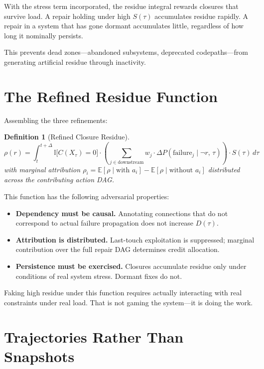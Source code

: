 \documentclass[12pt]{article}
\newtheorem{definition}{Definition}
\begin{document}
With the stress term incorporated, the residue integral rewards closures
that survive load. A repair holding under high $S(\tau)$ accumulates
residue rapidly. A repair in a system that has gone dormant accumulates
little, regardless of how long it nominally persists.

This prevents dead zones---abandoned subsystems, deprecated
codepaths---from generating artificial residue through inactivity.

\section{The Refined Residue Function}

Assembling the three refinements:

\begin{definition}[Refined Closure Residue]
\[
  \rho(r) = \int_{t}^{t+\Delta}
    \mathbb{I}\bigl[C(X_\tau) = 0\bigr]
    \cdot
    \left(
      \sum_{j \in \mathrm{downstream}}
        w_j \cdot \Delta P\!\left(\mathrm{failure}_j \mid \neg r,\, \tau\right)
    \right)
    \cdot S(\tau)
  \, d\tau
\]
with marginal attribution $\rho_i =
\mathbb{E}[\rho \mid \text{with } a_i] -
\mathbb{E}[\rho \mid \text{without } a_i]$
distributed across the contributing action DAG.
\end{definition}

This function has the following adversarial properties:
\begin{itemize}
  \item \textbf{Dependency must be causal.} Annotating connections that
    do not correspond to actual failure propagation does not increase
    $D(\tau)$.
  \item \textbf{Attribution is distributed.} Last-touch exploitation is
    suppressed; marginal contribution over the full repair DAG
    determines credit allocation.
  \item \textbf{Persistence must be exercised.} Closures accumulate
    residue only under conditions of real system stress. Dormant fixes
    do not.
\end{itemize}

Faking high residue under this function requires actually interacting
with real constraints under real load. That is not gaming the
system---it is doing the work.

\section{Trajectories Rather Than Snapshots}
\end{document}
